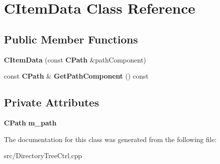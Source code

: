\section{CItemData Class Reference}
\label{classCItemData}
\subsection*{Public Member Functions}
\begin{DoxyCompactItemize}
\item 
{\bfseries CItemData} (const {\bf CPath} \&pathComponent)\label{classCItemData_aac4dbbc958e5caaf04d6c59fa7d340b4}

\item 
const {\bf CPath} \& {\bfseries GetPathComponent} () const \label{classCItemData_ac7289532611f263e44bb38de9dbb95d9}

\end{DoxyCompactItemize}
\subsection*{Private Attributes}
\begin{DoxyCompactItemize}
\item 
{\bf CPath} {\bfseries m\_\-path}\label{classCItemData_a3b58f021766136199730c02e8735a4b1}

\end{DoxyCompactItemize}


The documentation for this class was generated from the following file:\begin{DoxyCompactItemize}
\item 
src/DirectoryTreeCtrl.cpp\end{DoxyCompactItemize}
